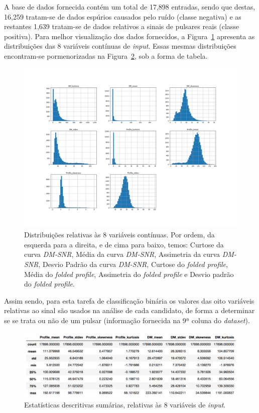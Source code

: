 \documentclass[]{article}
\begin{document}
	A base de dados fornecida contém um total de 17,898 entradas, sendo que destas, 16,259 tratam-se de dados espúrios causados pelo ruído (classe negativa) e as restantes 1,639 tratam-se de dados relativos a sinais de pulsares reais (classe positiva). Para melhor visualização dos dados fornecidos, a Figura~\ref{fig:distribuicoes} apresenta as distribuições das 8 variáveis contínuas de \textit{input}. Essas mesmas distribuições encontram-se pormenorizadas na Figura~\ref{fig:descricao_do_dataset}, sob a forma de tabela.

    \begin{figure}[t]
	\centering
	\includegraphics[scale=0.3]{img/distribution.png}
    \caption{Distribuições relativas às 8 variáveis contínuas. Por ordem, da esquerda para a direita, e de cima para baixo, temos: Curtose da curva \textit{DM-SNR}, Média da curva \textit{DM-SNR}, Assimetria da curva \textit{DM-SNR}, Desvio Padrão da curva \textit{DM-SNR}, Curtose do \textit{folded profile}, Média do \textit{folded profile}, Assimetria do \textit{folded profile} e Desvio padrão do \textit{folded profile}.}
    \label{fig:distribuicoes}
    \end{figure}
    
    Assim sendo, para esta tarefa de classificação binária os valores das oito variáveis relativas ao sinal são usados na análise de cada candidato, de forma a determinar se se trata ou não de um pulsar (informação fornecida na 9ª coluna do \textit{dataset}).
    
    \begin{figure}[t]
	\centering
	\includegraphics[scale=0.24]{img/distTable.png}
    \caption{Estatísticas descritivas sumárias, relativas às 8 variáveis de \textit{input}.}
    \label{fig:descricao_do_dataset}
    \end{figure}
    
\end{document}
